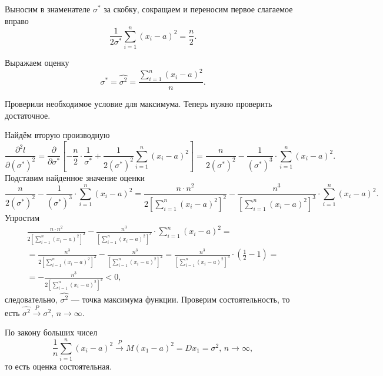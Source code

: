 Выносим в знаменателе $ \sigma^*$ за скобку, сокращаем и переносим первое слагаемое вправо
$$ \frac{1}{2 \sigma^*} \sum \limits_{i = 1}^n \left( x_i - a \right)^2 =
  \frac{n}{2}.$$

Выражаем оценку
$$ \sigma^* =
  \hat{ \sigma^2} =
  \frac{ \sum \limits_{i = 1}^n \left( x_i - a \right)^2}{n}.$$

Проверили необходимое условие для максимума.
Теперь нужно проверить достаточное.

Найдём вторую производную
$$ \frac{ \partial^2 l}{ \partial \left( \sigma^* \right)^2} =
  \frac{ \partial }{ \partial \sigma^*}
    \left[
      - \frac{n}{2} \cdot \frac{1}{ \sigma^*} +
      \frac{1}{2 \left( \sigma^* \right)^2} \sum \limits_{i = 1}^n \left( x_i - a \right)^2
    \right] =
  \frac{n}{2 \left( \sigma^* \right)^2} -
  \frac{1}{ \left( \sigma^* \right)^3} \cdot \sum \limits_{i = 1}^n \left( x_i - a \right)^2.$$
Подставим найденное значение оценки
$$ \frac{n}{2 \left( \sigma^* \right)^2} -
  \frac{1}{ \left( \sigma^* \right)^3} \cdot \sum \limits_{i = 1}^n \left( x_i - a \right)^2 =
  \frac{n \cdot n^2}{2 \left[ \sum \limits_{i = 1}^n \left( x_i - a \right)^2 \right]^2} -
  \frac{n^3}{ \left[ \sum \limits_{i = 1}^n \left( x_i - a \right)^2 \right]^3} \cdot
  \sum \limits_{i = 1}^n \left( x_i - a \right)^2.$$
Упростим
\begin{equation*}
  \begin{split}
    \frac{n \cdot n^2}{2 \left[ \sum \limits_{i = 1}^n \left( x_i - a \right)^2 \right]^2} -
    \frac{n^3}{ \left[ \sum \limits_{i = 1}^n \left( x_i - a \right)^2 \right]^3} \cdot
    \sum \limits_{i = 1}^n \left( x_i - a \right)^2 = \\
    = \frac{n^3}{2 \left[ \sum \limits_{i = 1}^n \left( x_i - a \right)^2 \right]^2} -
    \frac{n^3}{ \left[ \sum \limits_{i = 1}^n \left( x_i - a \right)^2 \right]^2} =
    \frac{n^3}{ \left[ \sum \limits_{i = 1}^n \left( x_i - a \right)^2 \right]^3} \cdot
    \left( \frac{1}{2} - 1 \right) = \\
    = - \frac{n^3}{2 \left[ \sum \limits_{i = 1}^n \left( x_i - a \right)^2 \right]^3} <
    0,
  \end{split}
\end{equation*}
следовательно, $ \hat{ \sigma^2}$ --- точка максимума функции.
Проверим состоятельность, то есть $ \hat{ \sigma^2} \overset{P}{ \to } \sigma^2, \, n \to \infty $.

По закону больших чисел
$$ \frac{1}{n} \sum \limits_{i = 1}^n \left( x_i - a \right)^2 \overset{P}{ \to }
  M \left( x_1 - a \right)^2 =
  Dx_1 =
  \sigma^2, \,
  n \to \infty,$$
то есть оценка состоятельная.

